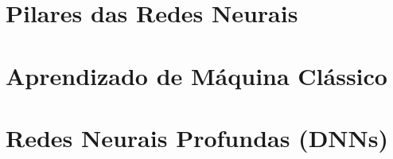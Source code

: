 \documentclass[
    12pt,            %
    a4paper,         %
    book,            %
    openright,       %
    twoside,         %
    brazil,          %
    citacao=authoryear
]{abntex2}
\begin{document}




\part{Pilares das Redes Neurais}








\part{Aprendizado de Máquina Clássico}








\part{Redes Neurais Profundas (DNNs)}













\end{document}
